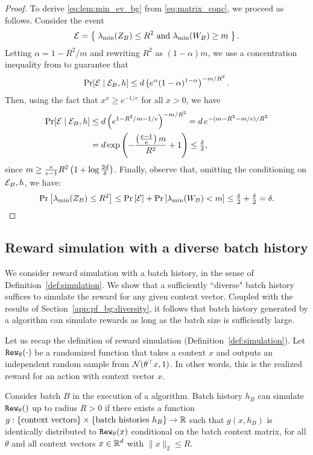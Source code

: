 \begin{proof}
To derive \eqref{eq:lem:min_ev_bg} from \eqref{eq:matrix_conc}, we proceed as follows. Consider the event
\[ \mathcal{E} = \left\{\;  \lambda_{\min}(Z_B) \le R^2 \text{ and }
             \lambda_{\min}(W_B) \ge m \; \right\}. \]
Letting $\alpha = 1 - R^2/m$ and rewriting $R^2$ as $(1-\alpha)m$, we use a concentration inequality from \citet{tropp2012user} to guarantee that
  \[
    \Pr[\mathcal{E} \;|\; \mathcal{E}_B,h]
        \le d \left(e^\alpha (1-\alpha)^{1-\alpha}\right)^{-m/R^2}.
  \]
  Then, using the fact that $x^x \ge e^{-1/e}$ for all $x > 0$, we
  have
\begin{align*}
\Pr[\mathcal{E} \;|\; \mathcal{E}_B,h]
    &\le d\left(e^{1-R^2/m-1/e}\right)^{-m/R^2}
    = d\, e^{-(m-R^2-m/e)/R^2} \\
    &= d \exp\left(-\frac{\left(\frac{e-1}{e}\right)m}{R^2} + 1\right)
    \le \tfrac{\delta}{2},
  \end{align*}
  since $m \ge \frac{e}{e-1} R^2 \left(1+\log \frac{2d}{\delta}\right)$.
  Finally, observe that, omitting the conditioning on $\mathcal{E}_B,h$, we have:
  \[
    \Pr\left[\lambda_{\min}(Z_B) \leq R^2 \right]
        \le \Pr\left[\mathcal{E}\right] + \Pr\left[\lambda_{\min}(W_B) < m\right] \le
    \tfrac{\delta}{2} + \tfrac{\delta}{2} = \delta.
  \]
\end{proof}



\subsection{Reward simulation with a diverse batch history}
\label{app:pf_bg:simulation}

We consider reward simulation with a batch history, in the sense of
Definition~\ref{def:simulation}. We show that a sufficiently ``diverse" batch
history suffices to simulate the reward for any given context vector. Coupled
with the results of Section~\ref{app:pf_bg:diversity}, it follows that batch history generated by a \GreedyStyle algorithm can simulate rewards as long as the batch size is sufficiently large.

Let us recap the definition of reward simulation (Definition~\ref{def:simulation}).  Let $\mathtt{Rew}_{\theta}(\cdot)$ be a randomized function that takes a context $x$ and outputs an independent random sample from $\mathcal{N}(\theta^{\top} x, 1)$. In other words, this is the realized reward for an action with context vector $x$.

\begin{definition}
Consider batch $B$ in the execution of a \GreedyStyle algorithm. Batch history $h_B$ can simulate $\mathtt{Rew}_{\theta}()$ up to radius $R>0$ if there exists a function
    $g: \{\text{context vectors}\}\times \{ \text{batch histories $h_B$}\} \to \mathbb{R}$
such that $g(x,h_B)$ is identically distributed to $\mathtt{Rew}_{\theta}(x)$ conditional on the batch context matrix, for all $\theta$ and all context vectors $x\in \mathbb{R}^d$ with $\|x\|_2\leq R$.
\label{def:simulation-app}
\end{definition}



